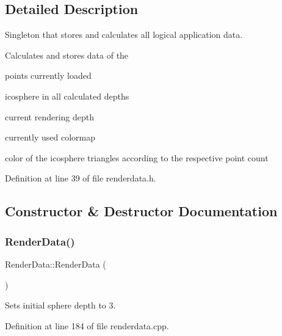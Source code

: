 \subsection{Detailed Description}
Singleton that stores and calculates all logical application data. 

Calculates and stores data of the
\begin{DoxyItemize}
\item points currently loaded
\item icosphere in all calculated depths
\item current rendering depth
\item currently used colormap
\item color of the icosphere triangles according to the respective point count 
\end{DoxyItemize}

Definition at line 39 of file renderdata.\+h.



\subsection{Constructor \& Destructor Documentation}
\mbox{\label{class_render_data_a16b04b2437ea3fa034381a138cbf2f83}} 
\subsubsection{\texorpdfstring{Render\+Data()}{RenderData()}\hspace{0.1cm}{\footnotesize\ttfamily [1/2]}}
{\footnotesize\ttfamily Render\+Data\+::\+Render\+Data (\begin{DoxyParamCaption}{ }\end{DoxyParamCaption})\hspace{0.3cm}{\ttfamily [private]}}



Sets initial sphere depth to 3. 



Definition at line 184 of file renderdata.\+cpp.

\mbox{\label{class_render_data_ab5f9324f666abc4b85fd2c6ed868c6be}} 
